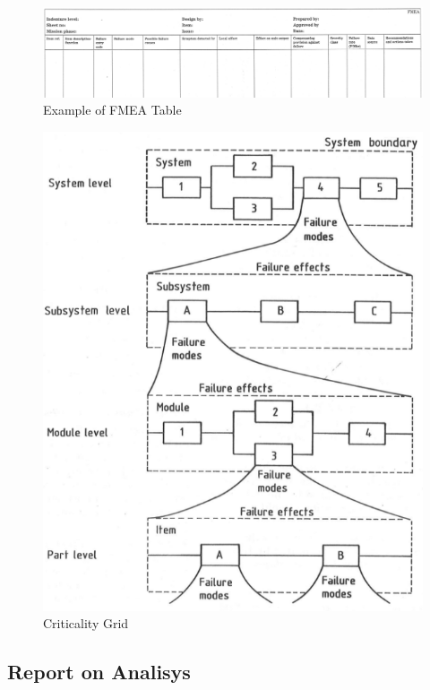 \documentclass[./dissertation.tex]{subfiles}
\begin{document}
\begin{figure}
        \includegraphics[width=\linewidth]{subfiles/imgs/FMEA_table.png}
  \caption{Example of FMEA Table}
        \label{fig:fmea_table}
\end{figure}


\begin{figure}
        \includegraphics[width=\linewidth]{subfiles/imgs/fmea_relationship_failure_mode_effects.png}
  \caption{Criticality Grid}
        \label{fig:criticality_grid}
\end{figure}


\subsection{Report on Analisys}
\end{document}
